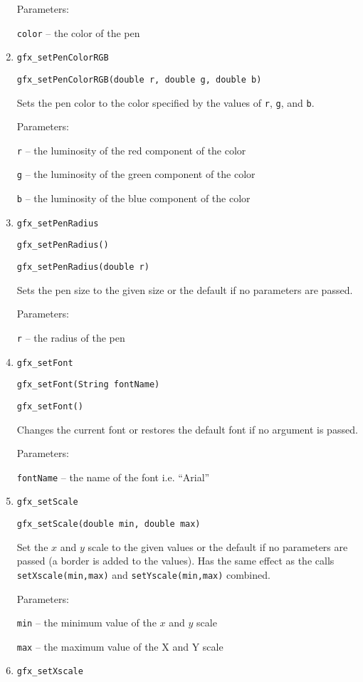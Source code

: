 \begin{enumerate}
      Parameters:

      \texttt{color} -- the color of the pen
\item \texttt{gfx\_setPenColorRGB}

      \texttt{gfx\_setPenColorRGB(double r, double g, double b)}

      Sets the pen color to the color specified by the values of \texttt{r},
      \texttt{g}, and \texttt{b}.

      Parameters:

      \texttt{r} -- the luminosity of the red component of the color

      \texttt{g} -- the luminosity of the green component of the color

      \texttt{b} -- the luminosity of the blue component of the color

\item \texttt{gfx\_setPenRadius}

      \texttt{gfx\_setPenRadius()}

      \texttt{gfx\_setPenRadius(double r)}

      Sets the pen size to the given size or the default if no parameters are passed.

      Parameters:

      \texttt{r} -- the radius of the pen
\item \texttt{gfx\_setFont}

      \texttt{gfx\_setFont(String fontName)}

      \texttt{gfx\_setFont()}

      Changes the current font or restores the default font if no argument is passed.
      
      Parameters:

      \texttt{fontName} -- the name of the font i.e. ``Arial''
\item \texttt{gfx\_setScale}

      \texttt{gfx\_setScale(double min, double max)}

      Set the $x$ and $y$ scale to the given values or the default 
      if no parameters are passed (a border is added to the values). 
      Has the same effect as the calls  \texttt{setXscale(min,max)} and \texttt{setYscale(min,max)}
      combined.

      Parameters:

      \texttt{min} -- the minimum value of the $x$ and $y$ scale 

      \texttt{max} -- the maximum value of the X and Y scale
\item \texttt{gfx\_setXscale}


\end{enumerate}
